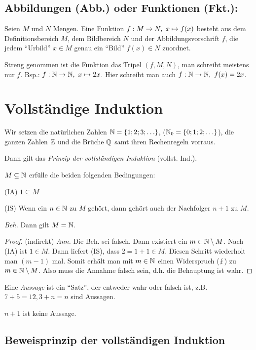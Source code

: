 \documentclass[12pt]{scrreprt}
\begin{document}
\subsection*{Abbildungen (Abb.) oder Funktionen (Fkt.):}
Seien $M$ und $N$ Mengen. Eine Funktion $f: M \rightarrow N,\ x \mapsto f(x)$ besteht aus dem Definitions\-bereich $M$, dem Bildbereich $N$ und der Abbildungsvorschrift $f$, die jedem "`Urbild"' $x \in M$ genau ein "`Bild"' $f(x) \in N$ zuordnet.

Streng genommen ist die Funktion das Tripel $(f, M, N)$, man schreibt meistens nur $f$. Bsp.: $f: \mathbb{N} \rightarrow \mathbb{N},\ x \mapsto 2x$. Hier schreibt man auch $f: \mathbb{N} \rightarrow \mathbb{N},\ f(x) = 2x$.

\section{Vollständige Induktion}
\label{sec:vor.vollstInd}
Wir setzen die natürlichen Zahlen $\mathbb{N} = \{1; 2; 3; \ldots\}$, ($\mathbb{N}_0 = \{0; 1; 2; \ldots\}$), die ganzen Zahlen $\mathbb{Z}$ und die Brüche $\mathbb{Q}$ samt ihren Rechenregeln vorraus.

Dann gilt das \textit{Prinzip der vollständigen Induktion} (vollst. Ind.).

$M \subseteq \mathbb{N}$ erfülle die beiden folgenden Bedingungen:

(IA) $1 \subseteq M$

(IS) Wenn ein $n\in\mathbb{N}$ zu $M$ gehört, dann gehört auch der Nachfolger $n + 1$ zu $M$.

\noindent\textit{Beh.} Dann gilt $M = \mathbb{N}$.
\begin{proof}
(indirekt) \textit{Ann.} Die Beh. sei falsch. Dann existiert ein $m\in\mathbb{N} \setminus M$. Nach (IA) ist $1 \in M$. Dann liefert (IS), dass $2 = 1 + 1 \in M$. Diesen Schritt wiederholt man $(m - 1)$ mal. Somit erhält man mit $m\in\mathbb{N}$ einen Widerspruch ($\lightning$) zu $m\in\mathbb{N} \setminus M$. Also muss die Annahme falsch sein, d.h. die Behauptung ist wahr.
\end{proof}

Eine \textit{Aussage} ist ein "`Satz"', der entweder wahr oder falsch ist, z.B. $7 + 5 = 12, 3 + n = n$ sind Aussagen.

$n + 1$ ist keine Aussage.

\subsection*{Beweisprinzip der vollständigen Induktion}
\end{document}
